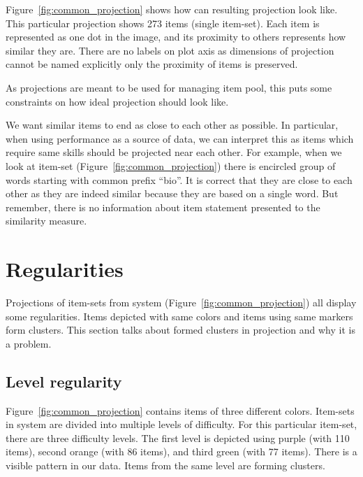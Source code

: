 \documentclass[
  printed, %
  table,   %
  nolof,     %
  nolot,     %
  color,
  final,
  nocover
]{fithesis3}
\begin{document}

Figure~\ref{fig:common_projection} shows how can resulting projection look like. This particular projection shows 273 items (single item-set). Each item is represented as one dot in the image, and its proximity to others represents how similar they are. There are no labels on plot axis as dimensions of projection cannot be named explicitly only the proximity of items is preserved.


As projections are meant to be used for managing item pool, this puts some constraints on how ideal projection should look like.

We want similar items to end as close to each other as possible. In particular, when using performance as a source of data, we can interpret this as items which require same skills should be projected near each other. For example, when we look at item-set \cviceniB{} (Figure~\ref{fig:common_projection}) there is encircled group of words starting with common prefix ``bio''. It is correct that they are close to each other as they are indeed similar because they are based on a single word. But remember, there is no information about item statement presented to the similarity measure.


\section{Regularities}\label{regularities}


Projections of item-sets from system \umimeCesky{} (Figure~\ref{fig:common_projection}) all display some regularities. Items depicted with same colors and items using same markers form clusters. This section talks about formed clusters in projection and why it is a problem.


\subsection{Level regularity}\label{regularities-level-regularity}


Figure~\ref{fig:common_projection} contains items of three different colors. Item-sets in system \umimeCesky{} are divided into multiple levels of difficulty. For this particular item-set, there are three difficulty levels. The first level is depicted using purple (with 110 items), second orange (with 86 items), and third green (with 77 items). There is a visible pattern in our data. Items from the same level are forming clusters.
\end{document}
